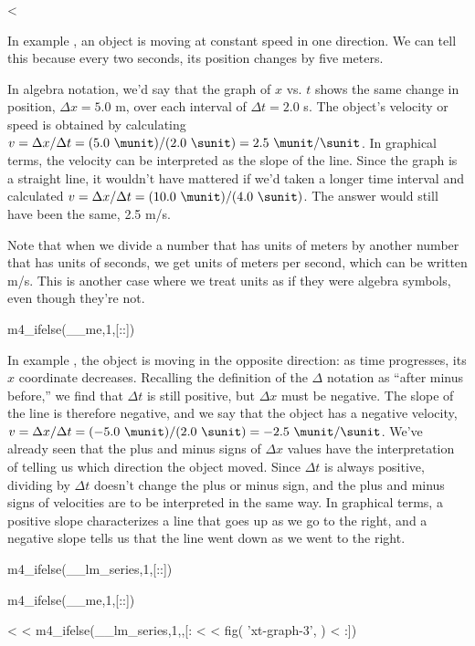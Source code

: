 <%

In example , an object is moving at constant speed in one
direction.  We can tell this because every two seconds, its
position changes by five meters.

In algebra notation, we'd say that the graph of $x$ vs. $t$
shows the same change in position, $\Delta x=5.0$ m, over
each interval of $\Delta t=2.0$ s.  The object's velocity
or speed is obtained by calculating 
$v=\Delta x/\Delta t=(5.0\ \munit)/(2.0\ \sunit)=2.5\ \munit/\sunit$.
In graphical terms, the
velocity can be interpreted as the slope of the line.  Since
the graph is a straight line, it wouldn't have mattered if
we'd taken a longer time interval and calculated 
$v=\Delta x/\Delta t=(10.0\ \munit)/(4.0\ \sunit)$.  The answer would still have
been the same, 2.5 m/s.

Note that when we divide a number that has units of meters
by another number that has units of seconds, we get units of
meters per second, which can be written m/s.  This is
another case where we treat units as if they were algebra
symbols, even though they're not.

m4_ifelse(__me,1,[:\enlargethispage{\baselineskip}:])

In example , the object is moving in the opposite
direction: as time progresses, its $x$ coordinate decreases.
Recalling the definition of the $\Delta$ notation as
``after minus before,'' we find that $\Delta t$ is still
positive, but $\Delta x$ must be negative.  The slope of the
line is therefore negative, and we say that the object has a
negative velocity, 
$v=\Delta x/\Delta t=(-5.0\ \munit)/(2.0\ \sunit)=-2.5\ \munit/\sunit$.
We've already seen that the plus and minus
signs of $\Delta x$ values have the interpretation of
telling us which direction the object moved.  Since $\Delta t$
is always positive, dividing by $\Delta t$ doesn't change
the plus or minus sign, and the plus and minus signs of
velocities are to be interpreted in the same way.  In
graphical terms, a positive slope characterizes a line that
goes up as we go to the right, and a negative slope tells us
that the line went down as we went to the right.

m4_ifelse(__lm_series,1,[::])

m4_ifelse(__me,1,[:\pagebreak[4]:])

<%
<%
m4_ifelse(__lm_series,1,,[:
<%
<%
  fig(
    'xt-graph-3',
  )
<%
:])

